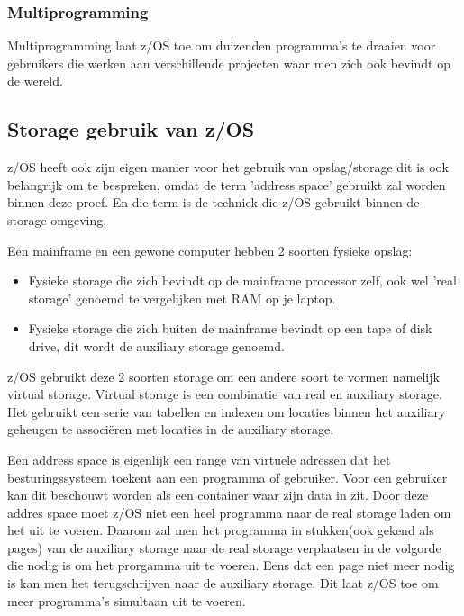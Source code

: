 \subsubsection{Multiprogramming}
\label{subsubsec:Multiprogramming}
Multiprogramming laat z/OS toe om duizenden programma's te draaien voor gebruikers die werken aan verschillende projecten waar men zich ook bevindt op de wereld.

\subsection{Storage gebruik van z/OS}
\label{subsec:Storage gebruik van z/OS}

z/OS heeft ook zijn eigen manier voor het gebruik van opslag/storage dit is ook belangrijk om te bespreken, omdat de term 'address space' gebruikt zal worden binnen deze proef. En die term is de techniek die z/OS gebruikt binnen de storage omgeving.

Een mainframe en een gewone computer hebben 2 soorten fysieke opslag:

\begin{itemize}
	\item Fysieke storage die zich bevindt op de mainframe processor zelf, ook wel 'real storage' genoemd te vergelijken met RAM op je laptop.
	\item Fysieke storage die zich buiten de mainframe bevindt op een tape of disk drive, dit wordt de auxiliary storage genoemd.
\end{itemize}

z/OS gebruikt deze 2 soorten storage om een andere soort te vormen namelijk virtual storage. Virtual storage is een combinatie van real en auxiliary storage. Het gebruikt een serie van tabellen en indexen om locaties binnen het auxiliary geheugen te associëren met locaties in de auxiliary storage.

Een address space is eigenlijk een range van virtuele adressen dat het besturingssysteem toekent aan een programma of gebruiker. Voor een gebruiker kan dit beschouwt worden als een container waar zijn data in zit. Door deze addres space moet z/OS niet een heel programma naar de real storage laden om het uit te voeren. Daarom zal men het programma in stukken(ook gekend als pages) van de auxiliary storage naar de real storage verplaatsen in de volgorde die nodig is om het prorgamma uit te voeren. Eens dat een page niet meer nodig is kan men het terugschrijven naar de auxiliary storage. Dit laat z/OS toe om meer programma's simultaan uit te voeren.

